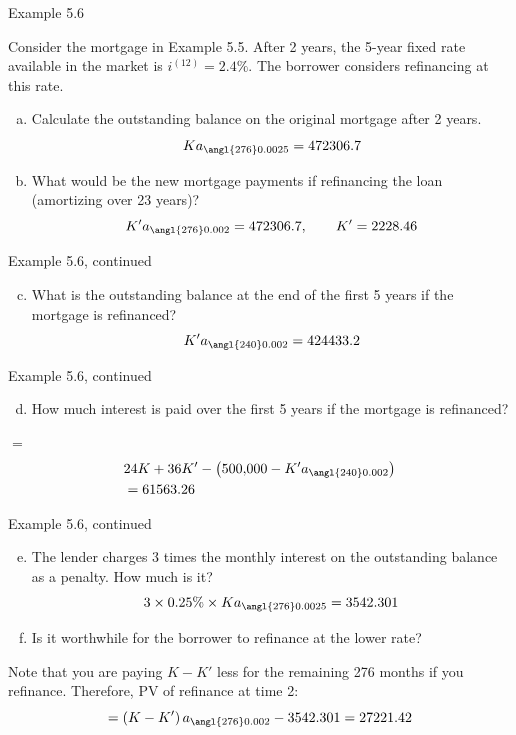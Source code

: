 \documentclass{beamer}
\begin{document}
\begin{frame}{Example 5.6}

Consider the mortgage in Example 5.5. After 2 years, the 5-year fixed rate available in the market is $i^{(12)} = 2.4\%$. The borrower considers refinancing at this rate.
\begin{enumerate}[a)]
\item Calculate the outstanding balance on the original mortgage after 2 years.
\[
K a_{\angl{276}0.0025} = 472306.7
\]
\item What would be the new mortgage payments if refinancing the loan (amortizing over 23 years)?
\[
K' a_{\angl{276}0.002} = 472306.7, \qquad K' = 2228.46
\]
\end{enumerate}

\end{frame}

\begin{frame}{Example 5.6, continued}

\begin{enumerate}[a)]
\setcounter{enumi}{2}
\item What is the outstanding balance at the end of the first 5 years if the mortgage is refinanced?
\[
K' a_{\angl{240}0.002} = 424433.2
\]
\end{enumerate}

\vfill
\end{frame}

\begin{frame}{Example 5.6, continued}

\begin{enumerate}[a)]
\setcounter{enumi}{3}
\item How much interest is paid over the first 5 years if the mortgage is refinanced?
\end{enumerate}

 $=$
\begin{align*}
&24K + 36K' - \left(500{,}000 - K' a_{\angl{240}0.002}\right) \\
&= 61563.26
\end{align*}

\vfill
\end{frame}

\begin{frame}{Example 5.6, continued}

\begin{enumerate}[a)]
\setcounter{enumi}{4}
\item The lender charges 3 times the monthly interest on the outstanding balance as a penalty. How much is it?
\[
3 \times 0.25\% \times K a_{\angl{276}0.0025} = 3542.301
\]
\item Is it worthwhile for the borrower to refinance at the lower rate?
\end{enumerate}

\small
Note that you are paying $K - K'$ less for the remaining 276 months if you refinance. Therefore, PV of refinance at time 2:
\[
= \left(K - K'\right) a_{\angl{276}0.002} - 3542.301 = 27221.42
\]

\end{frame}
\end{document}
